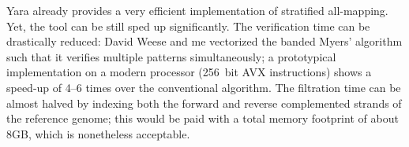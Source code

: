 Yara already provides a very efficient implementation of stratified all-mapping.
Yet, the tool can be still sped up significantly.
The verification time can be drastically reduced: David Weese and me vectorized the banded Myers' algorithm such that it verifies multiple patterns simultaneously; a prototypical implementation on a modern processor (256~bit AVX instructions) shows a speed-up of 4--6 times over the conventional algorithm.
The filtration time can be almost halved by indexing both the forward and reverse complemented strands of the reference genome; this would be paid with a total memory footprint of about 8GB, which is nonetheless acceptable.

